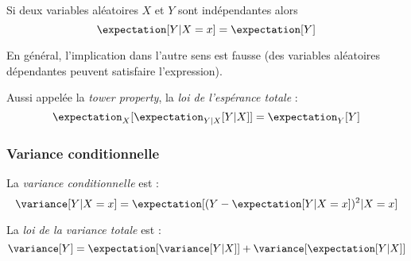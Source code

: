         \begin{theorem}[Indépendance]
            Si deux variables aléatoires \(X\) et \(Y\) sont indépendantes alors
            \[
                \expectation[Y | X = x] = \expectation[Y]
            \]

            En général, l'implication dans l'autre sens est fausse (des variables aléatoires dépendantes peuvent satisfaire l'expression).
        \end{theorem}

        \begin{definition}
            Aussi appelée la \textit{tower property}, la \textit{loi de l'espérance totale} :
            \[
                \expectation_X[\expectation_{Y|X}[Y|X]] = \expectation_Y[Y]
            \]
        \end{definition}

    \subsubsection{Variance conditionnelle}
        \begin{definition}
            La \textit{variance conditionnelle} est :
            \[
                \variance[Y | X = x] = \expectation[(Y - \expectation[Y | X = x])^2 | X = x]
            \]
        \end{definition}

        \begin{definition}
            La \textit{loi de la variance totale} est :
            \[
                \variance[Y] = \expectation[\variance[Y | X]] + \variance[\expectation[Y | X]]
            \]
        \end{definition}